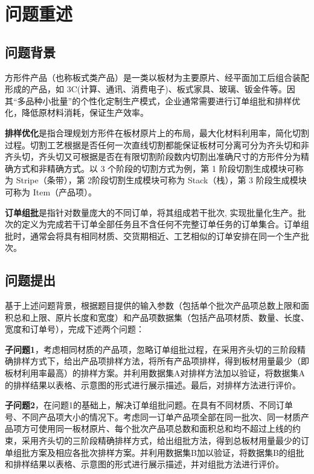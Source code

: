\documentclass[bwprint]{gmcmthesis}
\begin{document}

\section{问题重述}
\subsection{问题背景}

方形件产品（也称板式类产品）是一类以板材为主要原片、经平面加工后组合装配形成的产品，如 3C(计算、通讯、消费电子)、板式家具、玻璃、钣金件等。因其“多品种小批量”的个性化定制生产模式，企业通常需要进行订单组批和排样优化，降低原材料消耗，保证生产效率。

\textbf{排样优化}是指合理规划方形件在板材原片上的布局，最大化材料利用率，简化切割过程。切割工艺根据是否任何一次直线切割都能保证板材可分离可分为齐头切和非齐头切，齐头切又可根据是否在有限切割阶段数内切割出准确尺寸的方形件分为精确方式和非精确方式。以 3 个阶段的切割方式为例，第 1 阶段切割生成模块可称为 Stripe（条带），第 2阶段切割生成模块可称为 Stack（栈），第 3 阶段生成模块可称为 Item（产品项）。

\textbf{订单组批}是指针对数量庞大的不同订单，将其组成若干批次, 实现批量化生产。批次的定义为完成若干订单全部任务且不含任何不完整订单任务的订单集合。订单组批时，通常会将具有相同材质、交货期相近、工艺相似的订单安排在同一个生产批次。

\subsection{问题提出}
基于上述问题背景，根据题目提供的输入参数（包括单个批次产品项总数上限和面积总和上限、原片长度和宽度）和产品项数据集（包括产品项材质、数量、长度、宽度和订单号），完成下述两个问题：

\textbf{子问题1}，考虑相同材质的产品项，忽略订单组批过程，在采用齐头切的三阶段精确排样方式下，给出产品项排样方法，将所有产品项排样，得到板材用量最少（即板材利用率最高）的排样方案。并利用数据集A对排样方法加以验证，将数据集A的排样结果以表格、示意图的形式进行展示描述。最后，对排样方法进行评价。

\textbf{子问题2}，在问题1的基础上，解决订单组批问题。在具有不同材质、不同订单号、不同产品项大小的情况下。考虑同一订单产品项全部在同一批次、同一材质产品项方可使用同一板材原片、每个批次产品项总数和面积总和均不超过上线的约束，采用齐头切的三阶段精确排样方式，给出组批方法，得到总板材用量最少的订单组批方案及相应各批次排样方案。并利用数据集B加以验证，将数据集B的组批和排样结果以表格、示意图的形式进行展示描述，并对组批方法进行评价。
\end{document}
